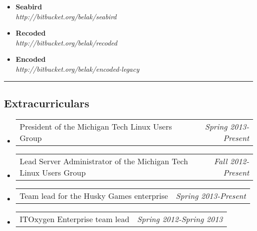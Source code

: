 \documentclass[10pt,letterpaper]{article}
\makeatletter
\newcommand{\headerrow}[2]
{\begin{tabular*}{\linewidth}{l@{\extracolsep{\fill}}r}
	#1 &
	#2 \\
\end{tabular*}}
\newcommand{\CPP}
{C\nolinebreak[4]\hspace{-.05em}\raisebox{.22ex}{\footnotesize\bf ++}}
\makeatother
\begin{document}
\begin{itemize}
	\parskip=0.1em

	\item {\textbf{Seabird}} \\
		\emph{http://bitbucket.org/belak/seabird}

	\item {\textbf{Recoded}} \\
		\emph{http://bitbucket.org/belak/recoded}

	\item {\textbf{Encoded}} \\
		\emph{http://bitbucket.org/belak/encoded-legacy}

\end{itemize}

\hrule
\vspace{-0.4em}
\subsection*{Extracurriculars}

\begin{itemize}
	\parskip=0.1em

	\item
	\headerrow
		{President of the Michigan Tech Linux Users Group}
		{\emph{Spring 2013-Present}}

	\item
	\headerrow
		{Lead Server Administrator of the Michigan Tech Linux Users Group}
		{\emph{Fall 2012-Present}}

	\item
	\headerrow
		{Team lead for the Husky Games enterprise}
		{\emph{Spring 2013-Present}}

	\item
	\headerrow
		{ITOxygen Enterprise team lead}
		{\emph{Spring 2012-Spring 2013}}

\end{itemize}
\end{document}
